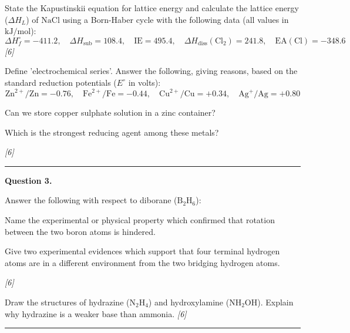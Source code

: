 \documentclass[11pt,a4paper]{article}
\newcommand{\pts}[1]{\hfill   \textit{[#1]}}
\begin{document}
\begin{parts}
  \item State the Kapustinskii equation for lattice energy and calculate the lattice energy ($\Delta H_L$) of $ \text{NaCl}$ using a Born-Haber cycle with the following data (all values in $ \text{kJ/mol}$):
    \[ \Delta H_f^\circ = -411.2, \quad \Delta H_{ \text{sub}} = 108.4, \quad  \text{IE} = 495.4, \quad \Delta H_{ \text{diss}}( \text{Cl}_2) = 241.8, \quad  \text{EA}( \text{Cl}) = -348.6 \] \pts{6}
  \item Define 'electrochemical series'. Answer the following, giving reasons, based on the standard reduction potentials ($E^\circ$ in volts):
    \[  \text{Zn}^{2+}/ \text{Zn} = -0.76, \quad  \text{Fe}^{2+}/ \text{Fe} = -0.44, \quad  \text{Cu}^{2+}/ \text{Cu} = +0.34, \quad  \text{Ag}^+/ \text{Ag} = +0.80 \]
  
\begin{parts}
    \item Can we store copper sulphate solution in a zinc container?
    \item Which is the strongest reducing agent among these metals?
  \end{parts} \pts{6}
\end{parts}

\medskip\rule{\linewidth}{0.2pt}




\noindent   \textbf{Question 3.}

\begin{parts}
  \item Answer the following with respect to diborane ($ \text{B}_2 \text{H}_6$):
  
\begin{parts}
    \item Name the experimental or physical property which confirmed that rotation between the two boron atoms is hindered.
    \item Give two experimental evidences which support that four terminal hydrogen atoms are in a different environment from the two bridging hydrogen atoms.
  \end{parts} \pts{6}
  \item Draw the structures of hydrazine ($ \text{N}_2 \text{H}_4$) and hydroxylamine ($ \text{NH}_2 \text{OH}$). Explain why hydrazine is a weaker base than ammonia. \pts{6}
\end{parts}

\medskip\rule{\linewidth}{0.2pt}
\end{document}
